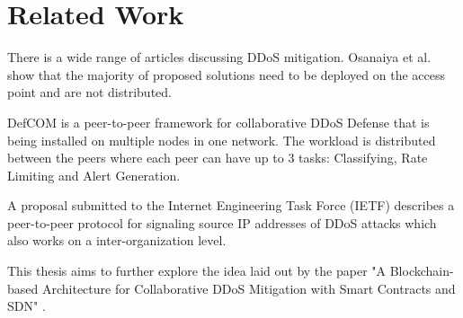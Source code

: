 \chapter{Related Work}

There is a wide range of articles discussing DDoS mitigation. Osanaiya et al. \cite{DDoSOverview} show that the majority of proposed solutions need to be deployed on the access point and are not distributed.

DefCOM \cite{DefCOM} is a peer-to-peer framework for collaborative DDoS Defense that is being installed on multiple nodes in one network. The workload is distributed between the peers where each peer can have up to 3 tasks: Classifying, Rate Limiting and Alert Generation.

A proposal submitted to the Internet Engineering Task Force (IETF) \cite{IETFDraft} describes a peer-to-peer protocol for signaling source IP addresses of DDoS attacks which also works on a inter-organization level.

This thesis aims to further explore the idea laid out by the paper "A Blockchain-based Architecture for Collaborative DDoS Mitigation with Smart Contracts and SDN" \cite{OriginalPaper}.
